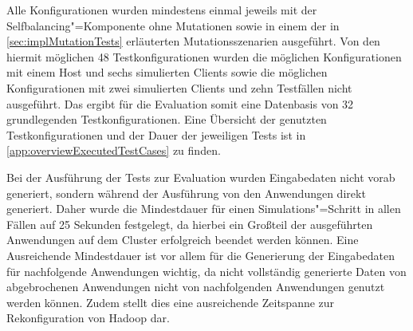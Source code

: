 Alle Konfigurationen wurden mindestens einmal jeweils mit der Selfbalancing"=Komponente ohne Mutationen sowie in einem der in \autoref{sec:implMutationTests} erläuterten Mutationsszenarien ausgeführt.
Von den hiermit möglichen 48 Testkonfigurationen wurden die möglichen Konfigurationen mit einem Host und sechs simulierten Clients sowie die möglichen Konfigurationen mit zwei simulierten Clients und zehn Testfällen nicht ausgeführt.
Das ergibt für die Evaluation somit eine Datenbasis von 32 grundlegenden Testkonfigurationen.
Eine Übersicht der genutzten Testkonfigurationen und der Dauer der jeweiligen Tests ist in \autoref{app:overviewExecutedTestCases} zu finden.

Bei der Ausführung der Tests zur Evaluation wurden Eingabedaten nicht vorab generiert, sondern während der Ausführung von den Anwendungen direkt generiert.
Daher wurde die Mindestdauer für einen Simulations"=Schritt in allen Fällen auf 25 Sekunden festgelegt, da hierbei ein Großteil der ausgeführten Anwendungen auf dem Cluster erfolgreich beendet werden können.
Eine Ausreichende Mindestdauer ist vor allem für die Generierung der Eingabedaten für nachfolgende Anwendungen wichtig, da nicht vollständig generierte Daten von abgebrochenen Anwendungen nicht von nachfolgenden Anwendungen genutzt werden können.
Zudem stellt dies eine ausreichende Zeitspanne zur Rekonfiguration von Hadoop dar.
